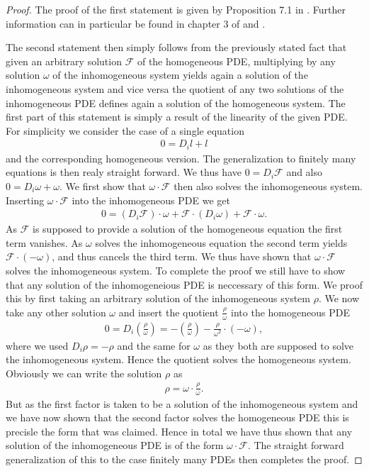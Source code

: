 \documentclass[a4paper,12pt, DIV=14, BCOR=5mm, twoside, headsepline, numbers=noenddot]{scrbook}
\begin{document}
\begin{proof}
The proof of the first statement is given by Proposition 7.1 in \cite{seiler1994analysis}. Further information can in particular be found in chapter 3 of \cite{seiler2009involution} and \cite{articleCH}. 

The second statement then simply follows from the previously stated fact that given an arbitrary solution $\mathcal{F}$ of the homogeneous PDE, multiplying by any solution $\omega$ of the inhomogeneous system yields again a solution of the inhomogeneous system and vice versa the quotient of any two solutions of the inhomogeneous PDE defines again a solution of the homogeneous system. The first part of this statement is simply a result of the linearity of the given PDE. For simplicity we consider the case of a single equation 
\begin{align}
    0=D_i l + l 
\end{align}
and the corresponding homogeneous version. The generalization to finitely many equations is then realy straight forward. 
We thus have $0 = D_i \mathcal{F}$ and also $0 = D_i \omega + \omega$.
We first show that $\omega \cdot \mathcal{F}$ then also solves the inhomogeneous system. Inserting $\omega \cdot \mathcal{F}$ into the inhomogeneous PDE we get 
\begin{align}
    0 = \left ( D_i \mathcal{F} \right ) \cdot \omega + \mathcal{F} \cdot \left ( D_i \omega \right) + \mathcal{F} \cdot \omega. 
\end{align}
As $\mathcal{F}$ is supposed to provide a solution of the homogeneous equation the first term vanishes. As $\omega$ solves the inhomogeneous equation the second term yields $\mathcal{F} \cdot \left ( - \omega \right )$,
and thus cancels the third term. We thus have shown that $\omega \cdot \mathcal{F}$ solves the inhomogeneous system. To complete the proof we still have to show that any solution of the inhomogeneious PDE is neccessary of this form. We proof this by first taking an arbitrary solution of the inhomogeneous system $\rho$. We now take any other solution $\omega$ and insert the quotient $\frac{\rho}{\omega}$ into the homogeneous PDE
\begin{align}
    0 = D_i \left (\frac{\rho}{\omega} \right) = - (\frac{\rho}{\omega}) - \frac{\rho}{\omega^2} \cdot (-\omega) ,
\end{align}
where we used $D_i \rho = -\rho$ and the same for $\omega$ as they both are supposed to solve the inhomogeneous system. Hence the quotient solves the homogeneous system. Obviously we can write the solution $\rho$ as 
\begin{align}
    \rho = \omega \cdot  \frac{\rho}{\omega}.
\end{align}
But as the first factor is taken to be a solution of the inhomogeneous system and we have now shown that the second factor solves the homogeneous PDE this is precisle the form that was claimed. 
Hence in total we have thus shown that any solution of the inhomogeneous PDE is of the form $\omega \cdot \mathcal{F}$.
The straight forward generalization of this to the case finitely many PDEs then completes the proof.
\end{proof}
\end{document}
